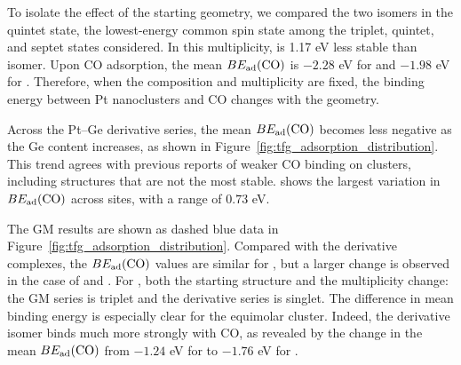 To isolate the effect of the starting geometry, we compared
the two  isomers in the quintet state, the lowest-energy common spin
state among the triplet, quintet, and septet states considered. In this
multiplicity,  is 1.17 eV less stable than
isomer. Upon CO adsorption, the mean \(BE_{\rm ad}(\ce{CO})\) is \(-2.28\) eV
for  and \(-1.98\) eV for . Therefore, when the
composition and multiplicity are fixed, the binding energy  between Pt nanoclusters and CO changes with the geometry. 

Across the Pt--Ge derivative series, the mean \(BE_{\rm ad}(\ce{CO})\) becomes less negative as the Ge content increases, as shown in Figure~\ref{fig:tfg_adsorption_distribution}. This trend agrees with previous reports of weaker CO binding on  clusters, including structures that are not the most stable\cite{ugartemendia:2021,ugartemendia:2022,poths:2023}.  shows the largest variation in \(BE_{\rm ad}(\ce{CO})\) across sites, with a range of \(0.73\) eV.

The GM results are shown as dashed blue data in
Figure~\ref{fig:tfg_adsorption_distribution}. Compared with the derivative complexes, the \(BE_{\rm ad}(\ce{CO})\) values are similar for , but a larger change is observed in the case of 
 and . For , both the starting structure and the multiplicity change: the GM series is triplet and the derivative series is singlet. The difference in mean binding energy is especially clear for
the equimolar  cluster. Indeed, the derivative isomer binds much more strongly with CO, as revealed by the change in the mean $BE_{\rm ad}(\ce{CO})$ from $-1.24$ eV for  to $-1.76$ eV for .

